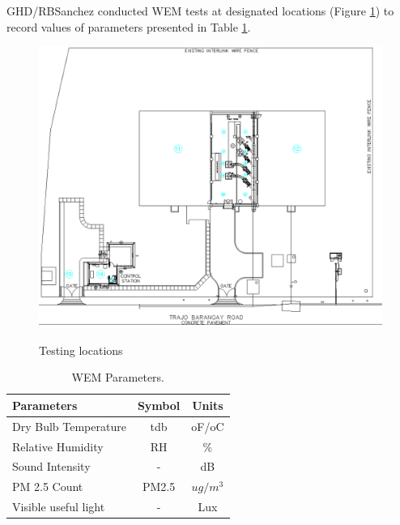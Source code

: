 GHD/RBSanchez conducted WEM tests at designated locations (Figure \ref{fig_ch02_wem01}) to record values of parameters presented in Table \ref{ch02_tbl_wemparameter}.

\begin{figure}[!htb]
	\includegraphics[width = \textwidth]{figures/fig_ch02_wem01} \\
	\caption{Testing locations}
	\label{fig_ch02_wem01} 
\end{figure}

\begin{table}[h]
	\caption{WEM Parameters.}
	\label{ch02_tbl_wemparameter}
	{\footnotesize
		\begin{tabular}{l|l|l}
			\hline
			Parameters & \multicolumn{1}{c|}{Symbol} & \multicolumn{1}{c}{Units} \\ 
			\hline
			Dry Bulb Temperature & \multicolumn{1}{c|}{tdb} & \multicolumn{1}{c}{oF/oC} \\ 
			Relative Humidity & \multicolumn{1}{c|}{RH} & \multicolumn{1}{c}{\%} \\ 
			Sound Intensity & \multicolumn{1}{c|}{-} & \multicolumn{1}{c}{dB} \\ 
			PM 2.5 Count & \multicolumn{1}{c|}{PM2.5} & \multicolumn{1}{c}{$ug/m^3$} \\ 
			Visible useful light & \multicolumn{1}{c|}{-} & \multicolumn{1}{c}{Lux} \\ 
			\hline
		\end{tabular}	
	}
\end{table}

